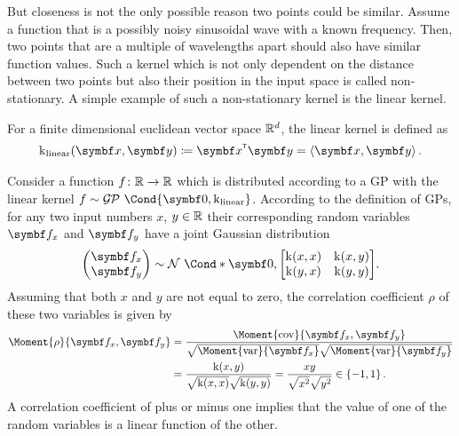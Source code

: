 But closeness is not the only possible reason two points could be similar.
Assume a function that is a possibly noisy sinusoidal wave with a known frequency.
Then, two points that are a multiple of wavelengths apart should also have similar function values.
Such a kernel which is not only dependent on the distance between two points but also their position in the input space is called non-stationary.
A simple example of such a non-stationary kernel is the linear kernel.
\begin{definition}
    For a finite dimensional euclidean vector space $\mathbb{R}^d$, the linear kernel is defined as
    \begin{align}
        \K_{\text{linear}}(\mat{x}, \mat{y}) \coloneqq \mat{x}\tran \mat{y} = \left\langle \mat{x}, \mat{y}\right\rangle.
    \end{align}
\end{definition}
Consider a function $f \colon \mathbb{R} \to \mathbb{R}$ which is distributed according to a GP with the linear kernel $f \sim \GP\Cond{\mat{0}, \K_{\text{linear}}}$.
According to the definition of GPs, for any two input numbers $x$, $y \in \mathbb{R}$ their corresponding random variables $\rv{f}_x$ and $\rv{f}_y$ have a joint Gaussian distribution
\begin{align}
    \begin{pmatrix}
        \rv{f}_x \\ \rv{f}_y
    \end{pmatrix} \sim \Gaussian*{\mat{0}, \begin{bmatrix}
            \K(x, x) & \K(x, y) \\
            \K(y, x) & \K(y, y)
        \end{bmatrix}}.
\end{align}
Assuming that both $x$ and $y$ are not equal to zero, the correlation coefficient $\rho$ of these two variables is given by
\begin{equation}
    \begin{split}
        \Moment{\rho}{\rv{f}_x, \rv{f}_y} &= \frac{\Moment{\cov}{\rv{f}_x, \rv{f}_y}}{\sqrt{\Moment{\var}{\rv{f}_x\vphantom{\rv{f}_y}}}\sqrt{\Moment{\var}{\rv{f}_y}}} \\
        &= \frac{\K(x, y)}{\sqrt{\K(x, x)} \sqrt{\K(y, y)}} = \frac{xy}{\sqrt{\vphantom{y^2}x^2}\sqrt{\vphantom{y^2}y^2}} \in \left\{ -1, 1 \right\}.
    \end{split}
\end{equation}
A correlation coefficient of plus or minus one implies that the value of one of the random variables is a linear function of the other.
